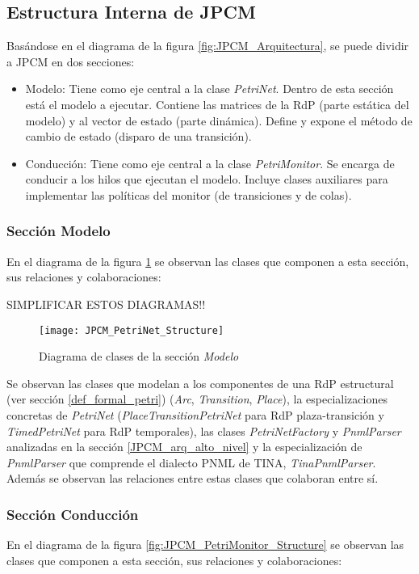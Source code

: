\subsection{Estructura Interna de JPCM}
Basándose en el diagrama de la figura \ref{fig:JPCM_Arquitectura}, se puede
dividir a JPCM en dos secciones:
\begin{itemize}
    \item Modelo: Tiene como eje central a la clase \textit{PetriNet}.
    Dentro de esta sección está el modelo a ejecutar. Contiene las matrices de
    la RdP (parte estática del modelo) y al vector de estado (parte dinámica).
    Define y expone el método de cambio de estado (disparo de una transición).
    \item Conducción: Tiene como eje central a la clase \textit{PetriMonitor}.
    Se encarga de conducir a los hilos que ejecutan el modelo.
    Incluye clases auxiliares para implementar las políticas del monitor (de
    transiciones y de colas).
\end{itemize}

\subsubsection{Sección Modelo}
En el diagrama de la figura \ref{fig:JPCM_PetriNet_Structure} se observan las
clases que componen a esta sección, sus relaciones y colaboraciones:

{\color{red} SIMPLIFICAR ESTOS DIAGRAMAS!!}
\begin{figure}[H]
  \hspace*{-3cm}
  \texttt{[image: JPCM\_PetriNet\_Structure]}
  \caption{Diagrama de clases de la sección \textit{Modelo}}
  \label{fig:JPCM_PetriNet_Structure}
\end{figure}

Se observan las clases que modelan a los componentes de una RdP estructural
(ver sección \ref{def_formal_petri}) (\textit{Arc}, \textit{Transition},
\textit{Place}), la especializaciones concretas de \textit{PetriNet}
(\textit{PlaceTransitionPetriNet} para RdP plaza-transición y
\textit{TimedPetriNet} para RdP temporales), las clases \textit{PetriNetFactory}
y \textit{PnmlParser} analizadas en la sección \ref{JPCM_arq_alto_nivel} y la
especialización de \textit{PnmlParser} que comprende el dialecto PNML de TINA,
\textit{TinaPnmlParser}. Además se observan las relaciones entre estas clases
que colaboran entre sí.

\subsubsection{Sección Conducción}
En el diagrama de la figura \ref{fig:JPCM_PetriMonitor_Structure} se observan
las clases que componen a esta sección, sus relaciones y colaboraciones:


